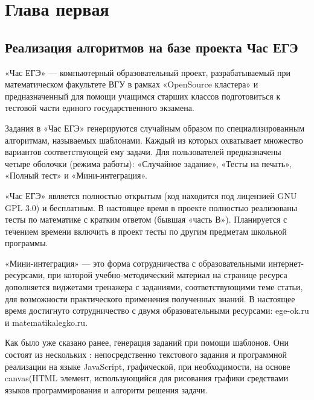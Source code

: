 
\section{Глава первая}
\subsection{Реализация алгоритмов на базе проекта Час ЕГЭ}
«Час ЕГЭ» — компьютерный образовательный проект, разрабатываемый при математическом факультете ВГУ в рамках «OpenSource кластера» и предназначенный для помощи учащимся старших классов подготовиться к тестовой части единого государственного экзамена.

Задания в «Час ЕГЭ» генерируются случайным образом по специализированным алгоритмам, называемых шаблонами.
Каждый из которых охватывает множество вариантов соответствующей ему задачи. Для пользователей предназначены четыре оболочки (режима работы): «Случайное задание», «Тесты на печать», «Полный тест» и «Мини-интеграция».

«Час ЕГЭ» является полностью открытым (код находится под лицензией GNU GPL 3.0) и бесплатным.
В настоящее время в проекте полностью реализованы тесты по математике с кратким ответом (бывшая «часть В»).
Планируется с течением времени включить в проект тесты по другим предметам школьной программы.

«Мини-интеграция» — это форма сотрудничества с образовательными интернет-ресурсами, при которой учебно-методический материал на странице ресурса дополняется виджетами тренажера с заданиями, соответствующими теме статьи, для возможности практического применения полученных знаний.
В настоящее время достигнуто сотрудничество с двумя образовательными ресурсами: ege-ok.ru и matematikalegko.ru.

Как было уже сказано ранее, генерация заданий при помощи шаблонов. Они состоят из нескольких : непосредственно текстового задания и программной реализации на языке JavaScript, графической, при необходимости, на основе canvas(HTML элемент, использующийся для рисования графики средствами языков программирования и алгоритм решения задачи.

